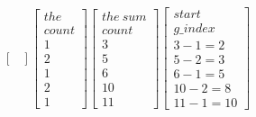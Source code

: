 \documentclass[,table,dvipsnames]{article}
\begin{document}
\[\begin{bmatrix}
\end{bmatrix}
\begin{bmatrix}
the\\ count \\  1\\ 2\\ 1  \\ 2\\1
\end{bmatrix}
\begin{bmatrix}
the\ sum\\ count \\ 3\\ 5\\ 6 \\ 10\\11
\end{bmatrix}
\begin{bmatrix}
start\\ g\_index \\3-1=2\\5-2=3\\6-1=5 \\10-2=8\\11-1=10
\end{bmatrix}
\]
\end{document}
